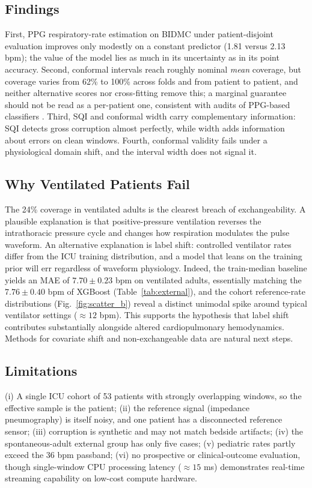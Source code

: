\documentclass[conference]{IEEEtran}
\begin{document}
\subsection{Findings}
First, PPG respiratory-rate estimation on BIDMC under patient-disjoint evaluation improves only modestly on a constant predictor (1.81 versus 2.13 bpm); the value of the model lies as much in its uncertainty as in its point accuracy. Second, conformal intervals reach roughly nominal \emph{mean} coverage, but coverage varies from 62\% to 100\% across folds and from patient to patient, and neither alternative scores nor cross-fitting remove this; a marginal guarantee should not be read as a per-patient one, consistent with audits of PPG-based classifiers \cite{kinalioglu2026conformal}. Third, SQI and conformal width carry complementary information: SQI detects gross corruption almost perfectly, while width adds information about errors on clean windows. Fourth, conformal validity fails under a physiological domain shift, and the interval width does not signal it.

\subsection{Why Ventilated Patients Fail}
The 24\% coverage in ventilated adults is the clearest breach of exchangeability. A plausible explanation is that positive-pressure ventilation reverses the intrathoracic pressure cycle and changes how respiration modulates the pulse waveform. An alternative explanation is label shift: controlled ventilator rates differ from the ICU training distribution, and a model that leans on the training prior will err regardless of waveform physiology. Indeed, the train-median baseline yields an MAE of $7.70\pm0.23$ bpm on ventilated adults, essentially matching the $7.76\pm0.40$ bpm of XGBoost (Table~\ref{tab:external}), and the cohort reference-rate distributions (Fig.~\ref{fig:scatter_b}) reveal a distinct unimodal spike around typical ventilator settings ($\approx 12$ bpm). This supports the hypothesis that label shift contributes substantially alongside altered cardiopulmonary hemodynamics. Methods for covariate shift and non-exchangeable data \cite{tibshirani2019covshift,barber2023beyond} are natural next steps.

\subsection{Limitations}
(i) A single ICU cohort of 53 patients with strongly overlapping windows, so the effective sample is the patient; (ii) the reference signal (impedance pneumography) is itself noisy, and one patient has a disconnected reference sensor; (iii) corruption is synthetic and may not match bedside artifacts; (iv) the spontaneous-adult external group has only five cases; (v) pediatric rates partly exceed the 36 bpm passband; (vi) no prospective or clinical-outcome evaluation, though single-window CPU processing latency ($\approx 15$ ms) demonstrates real-time streaming capability on low-cost compute hardware.
\end{document}
